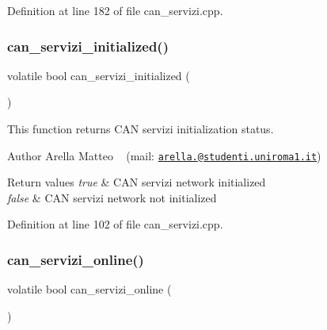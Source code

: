 Definition at line 182 of file can\+\_\+servizi.\+cpp.

\mbox{\label{group___c_a_n__servizi__group_gaa460928ec03256a076ebafceab10c2be}} 
\subsubsection{\texorpdfstring{can\+\_\+servizi\+\_\+initialized()}{can\_servizi\_initialized()}}
{\footnotesize\ttfamily volatile bool can\+\_\+servizi\+\_\+initialized (\begin{DoxyParamCaption}{ }\end{DoxyParamCaption})}



This function returns C\+AN servizi initialization status. 

\begin{DoxyAuthor}{Author}
Arella Matteo ~\newline
 (mail\+: \href{mailto:arella.1646983@studenti.uniroma1.it}{\tt arella.@studenti.\+uniroma1.\+it})
\end{DoxyAuthor}

\begin{DoxyRetVals}{Return values}
{\em true} & C\+AN servizi network initialized \\
\hline
{\em false} & C\+AN servizi network not initialized \\
\hline
\end{DoxyRetVals}


Definition at line 102 of file can\+\_\+servizi.\+cpp.

\mbox{\label{group___c_a_n__servizi__group_ga43e9ef52770f760c5751d83b138c7e6b}} 
\subsubsection{\texorpdfstring{can\+\_\+servizi\+\_\+online()}{can\_servizi\_online()}}
{\footnotesize\ttfamily volatile bool can\+\_\+servizi\+\_\+online (\begin{DoxyParamCaption}{ }\end{DoxyParamCaption})}




